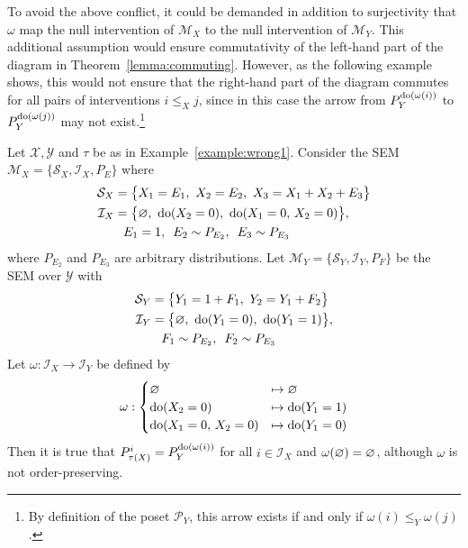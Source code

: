 To avoid the above conflict, it could be demanded in addition to surjectivity that $\omega$ map the null intervention of $\mathcal{M}_X$ to the null intervention of $\mathcal{M}_Y$.
This additional assumption would ensure commutativity of the left-hand part of the diagram in Theorem~\ref{lemma:commuting}.
However, as the following example shows, this would not ensure that the right-hand part of the diagram commutes for all pairs of interventions ${i \leq_X j}$, since in this case the arrow from $P_Y^{\operatorname{do}(\omega(i))}$ to $P_Y^{\operatorname{do}(\omega(j))}$ may not exist.\footnote{By definition of the poset $\mathcal{P}_Y$, this arrow exists if and only if $\omega(i) \leq_Y \omega(j)$.}

\medskip

\begin{example}\label{example:wrong2}
Let $\mathcal{X},\mathcal{Y}$ and $\tau$ be as in Example~\ref{example:wrong1}. Consider the SEM $\mathcal{M}_X=\{\mathcal{S}_X , \mathcal{I}_X, P_E\}$ where
%
\begin{align*}
\mathcal{S}_X = \big\{ & X_1 = E_1,\ X_2 = E_2, \ X_3 = X_1 + X_2 + E_3 \big\} \\
%
\mathcal{I}_X = \big\{ & \nulli,\ \doop(X_2=0),\ \doop(X_1=0,\, X_2=0)\big\}, \\
%
E_1 & = 1,\ \,  E_2 \sim P_{E_2}, \  \, E_3 \sim P_{E_3}
\end{align*}
%
where $P_{E_2}$ and $P_{E_3}$ are arbitrary distributions.
%
Let $\mathcal{M}_Y =\{\mathcal{S}_Y , \mathcal{I}_Y, P_F\}$ be the SEM over $\mathcal{Y}$ with
%
\begin{align*}
\mathcal{S}_Y = \big\{ & Y_1 =1+ F_1,\ Y_2 = Y_1 + F_2 \big\} \\
%
\mathcal{I}_Y = \big\{ & \nulli,\ \doop(Y_1=0),\ \doop(Y_1=1) \big\}, \\
%
F_1 &\sim P_{E_2},  \  \, F_2 \sim P_{E_3}
\end{align*}
%
Let ${\omega:\mathcal{I}_X \to \mathcal{I}_Y}$ be defined by
%
\begin{align*}
\omega: \begin{cases}
\varnothing &\mapsto \varnothing  \\
\operatorname{do}(X_2=0) &\mapsto \operatorname{do}(Y_1=1) \\
\operatorname{do}(X_1=0,\, X_2=0) &\mapsto \operatorname{do}(Y_1=0) \\
\end{cases}
\end{align*}
%
Then it is true that ${P_{\tau(X)}^{i} = P_Y^{\operatorname{do}(\omega(i))}}$ for all ${i \in \mathcal{I}_X}$ and $\omega(\varnothing)=\varnothing$, although $\omega$ is not order-preserving.
\end{example}


